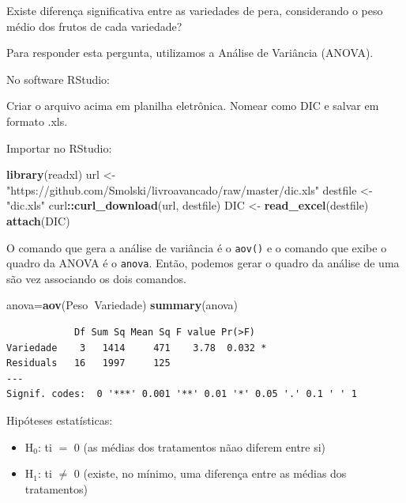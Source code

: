 \documentclass[12pt,brazil,oneside]{book}
\newenvironment{Shaded}{\begin{snugshade}}{\end{snugshade}}
\newcommand{\KeywordTok}[1]{\textcolor[rgb]{0.13,0.29,0.53}{\textbf{#1}}}
\newcommand{\NormalTok}[1]{#1}
\newcommand{\OperatorTok}[1]{\textcolor[rgb]{0.81,0.36,0.00}{\textbf{#1}}}
\newcommand{\StringTok}[1]{\textcolor[rgb]{0.31,0.60,0.02}{#1}}
\providecommand{\tightlist}{%
  \setlength{\itemsep}{0pt}\setlength{\parskip}{0pt}}
\begin{document}
Existe diferença significativa entre as variedades de pera, considerando o peso médio dos frutos de cada variedade?

Para responder esta pergunta, utilizamos a Análise de Variância (ANOVA).

No software RStudio:

Criar o arquivo acima em planilha eletrônica. Nomear como DIC e salvar em formato .xls.

Importar no RStudio:

\begin{Shaded}
\begin{Highlighting}[]
\KeywordTok{library}\NormalTok{(readxl)}
\NormalTok{url <-}\StringTok{ "https://github.com/Smolski/livroavancado/raw/master/dic.xls"}
\NormalTok{destfile <-}\StringTok{ "dic.xls"}
\NormalTok{curl}\OperatorTok{::}\KeywordTok{curl_download}\NormalTok{(url, destfile)}
\NormalTok{DIC <-}\StringTok{ }\KeywordTok{read_excel}\NormalTok{(destfile)}
\KeywordTok{attach}\NormalTok{(DIC)}
\end{Highlighting}
\end{Shaded}

O comando que gera a análise de variância é o \texttt{aov()} e o comando que exibe o quadro da ANOVA é o \texttt{anova}. Então, podemos gerar o quadro da análise de uma são vez associando os dois comandos.

\begin{Shaded}
\begin{Highlighting}[]
\NormalTok{anova=}\KeywordTok{aov}\NormalTok{(Peso}\OperatorTok{~}\NormalTok{Variedade)}
\KeywordTok{summary}\NormalTok{(anova)}
\end{Highlighting}
\end{Shaded}

\begin{verbatim}
            Df Sum Sq Mean Sq F value Pr(>F)  
Variedade    3   1414     471    3.78  0.032 *
Residuals   16   1997     125                 
---
Signif. codes:  0 '***' 0.001 '**' 0.01 '*' 0.05 '.' 0.1 ' ' 1
\end{verbatim}

Hipóteses estatísticas:

\begin{itemize}
\tightlist
\item
  H\(_0\): ti \(=\) 0 (as médias dos tratamentos nãao diferem entre si)
\item
  H\(_1\): ti \(\neq\) 0 (existe, no mínimo, uma diferença entre as médias dos tratamentos)
\end{itemize}
\end{document}
